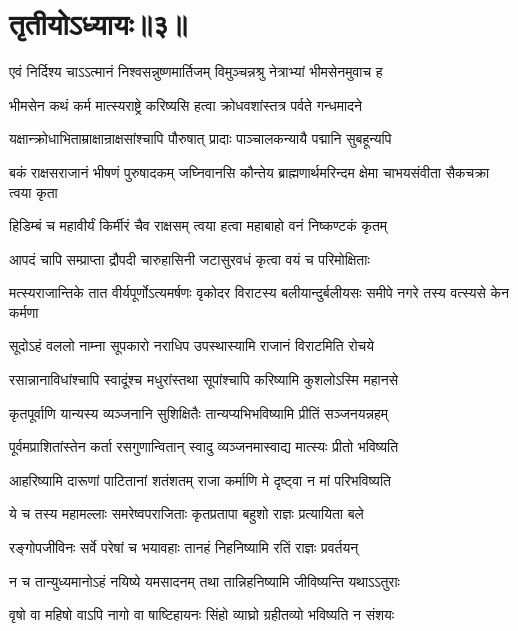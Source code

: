 \chapter{तृतीयोऽध्यायः॥३॥}

\twolineshloka
{एवं निर्दिश्य चाऽऽत्मानं निश्वसन्नुष्णमार्तिजम्}
{विमुञ्चन्नश्रु नेत्राभ्यां भीमसेनमुवाच ह}


\twolineshloka
{भीमसेन कथं कर्म मात्स्यराष्ट्रे करिष्यसि}
{हत्वा क्रोधवशांस्तत्र पर्वते गन्धमादने}


\twolineshloka
{यक्षान्क्रोधाभिताम्राक्षान्राक्षसांश्चापि पौरुषात्}
{प्रादाः पाञ्चालकन्यायै पद्मानि सुबहून्यपि}


\threelineshloka
{बकं राक्षसराजानं भीषणं पुरुषादकम्}
{जघ्निवानसि कौन्तेय ब्राह्मणार्थमरिन्दम}
{क्षेमा चाभयसंवीता सैकचक्रा त्वया कृता}


\twolineshloka
{हिडिम्बं च महावीर्यं किर्मीरं चैव राक्षसम्}
{त्वया हत्वा महाबाहो वनं निष्कण्टकं कृतम्}


\twolineshloka
{आपदं चापि सम्प्राप्ता द्रौपदी चारुहासिनी}
{जटासुरवधं कृत्वा वयं च परिमोक्षिताः}


\threelineshloka
{मत्स्यराजान्तिके तात वीर्यपूर्णोऽत्यमर्षणः}
{वृकोदर विराटस्य बलीयान्दुर्बलीयसः}
{समीपे नगरे तस्य वत्स्यसे केन कर्मणा}




\twolineshloka
{सूदोऽहं वललो नाम्ना सूपकारो नराधिप}
{उपस्थास्यामि राजानं विराटमिति रोचये}


\twolineshloka
{रसान्नानाविधांश्चापि स्वादूंश्च मधुरांस्तथा}
{सूपांश्चापि करिष्यामि कुशलोऽस्मि महानसे}


\twolineshloka
{कृतपूर्वाणि यान्यस्य व्यञ्जनानि सुशिक्षितैः}
{तान्यप्यभिभविष्यामि प्रीतिं सञ्जनयन्नहम्}


\twolineshloka
{पूर्वमप्राशितांस्तेन कर्ता रसगुणान्वितान्}
{स्वादु व्यञ्जनमास्वाद्य मात्स्यः प्रीतो भविष्यति}


\twolineshloka
{आहरिष्यामि दारूणां पाटितानां शतंशतम्}
{राजा कर्माणि मे दृष्ट्वा न मां परिभविष्यति}


\twolineshloka
{ये च तस्य महामल्लाः समरेष्वपराजिताः}
{कृतप्रतापा बहुशो राज्ञः प्रत्यायिता बले}


\twolineshloka
{रङ्गोपजीविनः सर्वे परेषां च भयावहाः}
{तानहं निहनिष्यामि रतिं राज्ञः प्रवर्तयन्}


\twolineshloka
{न च तान्युध्यमानोऽहं नयिष्ये यमसादनम्}
{तथा तान्निहनिष्यामि जीविष्यन्ति यथाऽऽतुराः}


\twolineshloka
{वृषो वा महिषो वाऽपि नागो वा षाष्टिहायनः}
{सिंहो व्याघ्रो ग्रहीतव्यो भविष्यति न संशयः}


